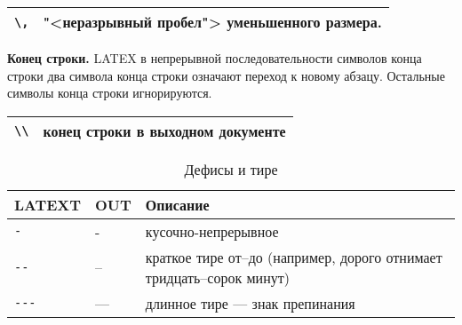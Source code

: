 \begin{table*}[h!]
    \begin{tabular}{|l|p{}|}
        \hline
        \verb|\,| & "<неразрывный пробел"> уменьшенного размера.\\
        \hline
    \end{tabular}
\end{table*}

\textbf{Конец строки.} LATEX в непрерывной последовательности символов конца строки два символа конца строки означают переход к новому абзацу. Остальные символы конца строки игнорируются.

\begin{table*}[h!]
    \begin{tabular}{|l|p{}|}
        \hline
        \verb|\\| & конец строки в выходном документе\\
        \hline
    \end{tabular}
\end{table*}

\begin{table}[h!]
    \caption{Дефисы и тире}
    \begin{tabular}{|l|l|p{}|}
        \hline
        \textbf{LATEXT} &
        \textbf{OUT}    &
        \textbf{Описание} \\ \hline
        \verb|-| & - & кусочно-непрерывное \\ \hline
        \verb|--| & -- & краткое тире от--до (например, дорого отнимает тридцать--сорок минут) \\ \hline
        \verb|---| & --- & длинное тире --- знак препинания \\ \hline
    \end{tabular}
\end{table}

\noindent{}

\clearpage